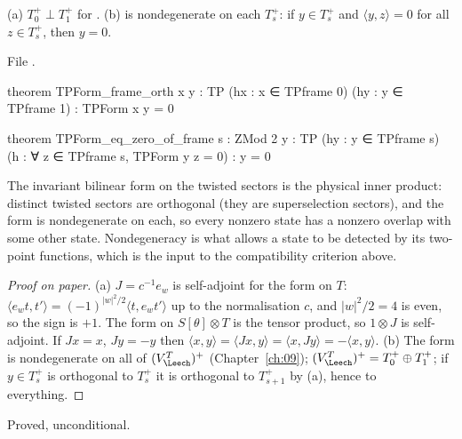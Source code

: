 \begin{theorem}\label{ch12:thm:TPForm}
(a) $T_0^+\perp T_1^+$ for .  (b)  is nondegenerate on each $T_s^+$: if
$y\in T_s^+$ and $\langle y,z\rangle=0$ for all $z\in T_s^+$, then $y=0$.
\end{theorem}
File .
\begin{leancode}
theorem TPForm_frame_orth {x y : TP} (hx : x ∈ TPframe 0) (hy : y ∈ TPframe 1) : TPForm x y = 0

theorem TPForm_eq_zero_of_frame {s : ZMod 2} {y : TP} (hy : y ∈ TPframe s)
    (h : ∀ z ∈ TPframe s, TPForm y z = 0) : y = 0
\end{leancode}

\begin{physics}
The invariant bilinear form on the twisted sectors is the physical inner product: distinct twisted sectors are orthogonal (they are superselection sectors), and the form is nondegenerate on each, so every nonzero state has a nonzero overlap with some other state. Nondegeneracy is what allows a state to be detected by its two-point functions, which is the input to the compatibility criterion above.
\end{physics}
\begin{proof}[Proof on paper]
(a) $J=c^{-1}e_w$ is self-adjoint for the form on $T$: $\langle e_wt,t'\rangle = (-1)^{|w|^2/2}\langle
t,e_wt'\rangle$ up to the normalisation $c$, and $|w|^2/2=4$ is even, so the sign is $+1$.  The form on
$S[\theta]\otimes T$ is the tensor product, so $1\otimes J$ is self-adjoint.  If $Jx=x$, $Jy=-y$ then
$\langle x,y\rangle=\langle Jx,y\rangle=\langle x,Jy\rangle=-\langle x,y\rangle$.  (b) The form is
nondegenerate on all of $(V_\Leech^T)^+$ (Chapter~\ref{ch:09}); $(V_\Leech^T)^+=T_0^+\oplus T_1^+$;
if $y\in T_s^+$ is orthogonal to $T_s^+$ it is orthogonal to $T_{s+1}^+$ by (a), hence to everything.
\end{proof}
\begin{status}Proved, unconditional.\end{status}

